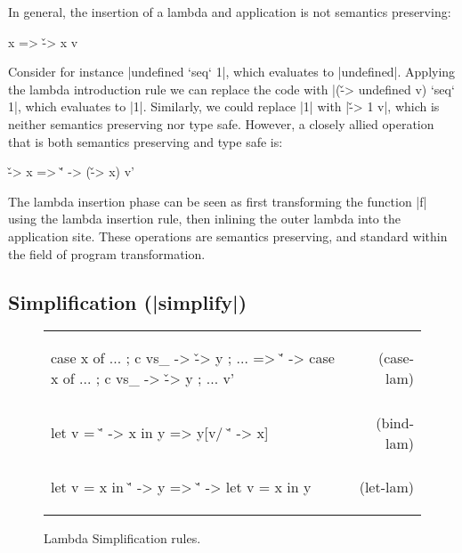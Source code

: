 \documentclass[preprint]{sigplanconf}
\begin{document}
In general, the insertion of a lambda and application is not semantics preserving:

\begin{code}
x => \v -> x v
\end{code}

Consider for instance |undefined `seq` 1|, which evaluates to |undefined|. Applying the lambda introduction rule we can replace the code with |(\v -> undefined v) `seq` 1|, which evaluates to |1|. Similarly, we could replace |1| with |\v -> 1 v|, which is neither semantics preserving nor type safe. However, a closely allied operation that is both semantics preserving and type safe is:

\begin{code}
\v -> x => \v' -> (\v -> x) v'
\end{code}

The lambda insertion phase can be seen as first transforming the function |f| using the lambda insertion rule, then inlining the outer lambda into the application site. These operations are semantics preserving, and standard within the field of program transformation.

\subsection{Simplification (|simplify|)}

\begin{figure}
\newcommand{\f}[2]{\vspace{-7mm} #2 & (#1) \\}

\begin{flushright}
\begin{tabular}{p{8cm}r}
\f{case-lam}{
\begin{code}
case x of {... ; c vs_ -> \v -> y ; ...}
    => \v' -> case x of {... ; c vs_ -> \v -> y ; ...} v'
\end{code}}

\f{bind-lam}{
\begin{code}
let v = \v' -> x in y
    => y[v/ \v' -> x]
\end{code}}


\f{let-lam}{
\begin{code}
let v = x in \v' -> y
    => \v' -> let v = x in y
\end{code}}
\end{tabular}
\end{flushright}
\caption{Lambda Simplification rules.}
\label{fig:lambda_simplify}
\end{figure}
\end{document}
